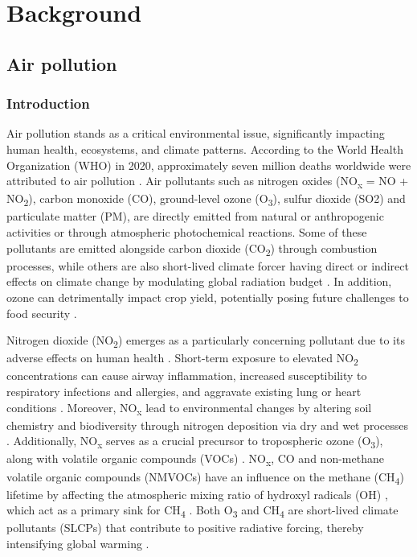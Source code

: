 \chapter{Background} \label{chap2}
\renewcommand{\headrulewidth}{0pt}
\lhead[\thepage]{\leftmark}
\rhead[\leftmark]{\thepage}
\cfoot[]{}

\section{Air pollution}
\subsection{Introduction}

Air pollution stands as a critical environmental issue, significantly impacting human health, ecosystems, and climate patterns. According to the World Health Organization (WHO) in 2020, approximately seven million deaths worldwide were attributed to air pollution \citep{who2020world}. Air pollutants such as nitrogen oxides (NO\textsubscript{x} = NO + NO\textsubscript{2}), carbon monoxide (CO), ground-level ozone (O\textsubscript{3}), sulfur dioxide (SO2) and particulate matter (PM), are directly emitted from natural or anthropogenic activities or through atmospheric photochemical reactions. Some of these pollutants are emitted alongside carbon dioxide (CO\textsubscript{2}) through combustion processes, while others are also short-lived climate forcer having direct or indirect effects on climate change by modulating global radiation budget \citep{RN3}. In addition, ozone can detrimentally impact crop yield, potentially posing future challenges to food security \citep{avnery2011global, avnery2011global2, chuwah2015global, tai2017impacts}.\par
Nitrogen dioxide (NO\textsubscript{2}) emerges as a particularly concerning pollutant due to its adverse effects on human health \citep{hamra2015lung}. Short-term exposure to elevated NO\textsubscript{2} concentrations can cause airway inflammation, increased susceptibility to respiratory infections and allergies, and aggravate existing lung or heart conditions \citep{bono2016air, kelly2011air}. Moreover, NO\textsubscript{x} lead to environmental changes by altering soil chemistry and biodiversity through nitrogen deposition via dry and wet processes \citep{bobbink2010global}. Additionally, NO\textsubscript{x} serves as a crucial precursor to tropospheric ozone (O\textsubscript{3}), along with volatile organic compounds (VOCs) \citep{akimoto2022rethinking}. NO\textsubscript{x}, CO and non-methane volatile organic compounds (NMVOCs) have an influence on the methane (CH\textsubscript{4}) lifetime by affecting the atmospheric mixing ratio of hydroxyl radicals (OH) \citep{akimoto2022rethinking}, which act as a primary sink for CH\textsubscript{4} \citep{turner2019interpreting}. Both O\textsubscript{3} and CH\textsubscript{4} are short-lived climate pollutants (SLCPs) that contribute to positive radiative forcing, thereby intensifying global warming \citep{akimoto2022rethinking}. 
